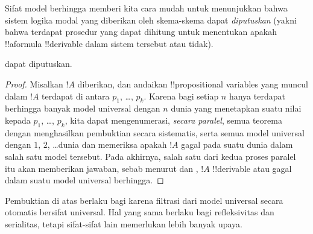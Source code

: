 \documentclass[../../../include/open-logic-section]{subfiles}
\begin{document}

Sifat model berhingga memberi kita cara mudah untuk menunjukkan bahwa sistem
logika modal yang diberikan oleh skema-skema dapat \emph{diputuskan} (yakni
bahwa terdapat prosedur yang dapat dihitung untuk menentukan apakah
!!a{formula} !!{derivable} dalam sistem tersebut atau tidak).

\begin{thm}
   dapat diputuskan.
\end{thm}

\begin{proof}
  Misalkan $!A$ diberikan, dan andaikan !!{propositional variable}s yang
  muncul dalam $!A$ terdapat di antara $p_1$, \dots, $p_k$. Karena bagi
  setiap $n$ hanya terdapat berhingga banyak model universal dengan $n$ dunia
  yang menetapkan suatu nilai kepada $p_1$, \dots, $p_k$, kita dapat
  mengenumerasi, \emph{secara paralel}, semua teorema  dengan
  menghasilkan pembuktian secara sistematis, serta semua model universal dengan
  $1$, $2$, \dots dunia dan memeriksa apakah $!A$ gagal pada suatu
  dunia dalam salah satu model tersebut. Pada akhirnya, salah satu dari kedua
  proses paralel itu akan memberikan jawaban, sebab menurut
   dan , $!A$
  !!{derivable} atau gagal dalam suatu model universal berhingga.
\end{proof}

Pembuktian di atas berlaku bagi  karena filtrasi dari model universal
secara otomatis bersifat universal. Hal yang sama berlaku bagi refleksivitas
dan serialitas, tetapi sifat-sifat lain memerlukan lebih banyak upaya.
\end{document}
